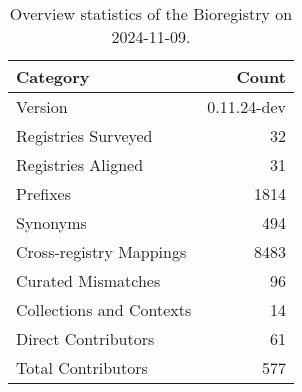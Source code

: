 \begin{table}
\caption{Overview statistics of the Bioregistry on 2024-11-09.}
\label{tab:bioregistry-summary}
\begin{tabular}{lr}
\toprule
Category & Count \\
\midrule
Version & 0.11.24-dev \\
Registries Surveyed & 32 \\
Registries Aligned & 31 \\
Prefixes & 1814 \\
Synonyms & 494 \\
Cross-registry Mappings & 8483 \\
Curated Mismatches & 96 \\
Collections and Contexts & 14 \\
Direct Contributors & 61 \\
Total Contributors & 577 \\
\bottomrule
\end{tabular}
\end{table}
